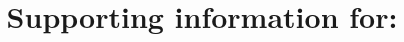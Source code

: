 \documentclass[aip,jcp,amsmath,amssymb,floatfix,reprint,citeautoscript,noeprint]{revtex4-1}
\begin{document}
\clearpage

\setcounter{section}{0}
\setcounter{equation}{0}
\setcounter{figure}{0}
\setcounter{table}{0}
\setcounter{page}{1}

\renewcommand{\thesection}{S\arabic{section}}
\renewcommand{\theequation}{S\arabic{equation}}
\renewcommand{\thefigure}{S\arabic{figure}}
\renewcommand{\thepage}{S\arabic{page}}
\renewcommand{\citenumfont}[1]{S#1}
\renewcommand{\bibnumfmt}[1]{$^{\rm{S#1}}$}


\title{Supporting information for: \mytitle}
{\maketitle}

\onecolumngrid
\end{document}
